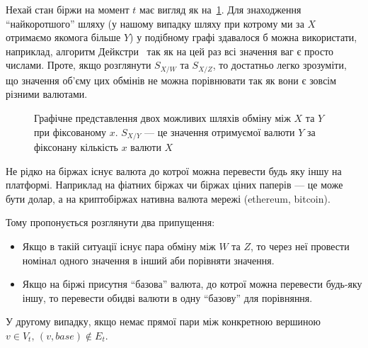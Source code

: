 \documentclass[../index.tex]{subfiles}
\begin{document}
Нехай стан біржи на момент $t$ має вигляд як на~\ref{fig:eval-func-graph}. Для
знаходження ``найкоротшого'' шляху (у нашому випадку шляху при котрому ми за $X$
отримаємо якомога більше $Y$) у подібному графі здавалося б можна використати,
наприклад, алгоритм Дейкстри~\cite{dijkstra} так як на цей раз всі значення ваг
є просто числами. Проте, якщо розглянути $S_{X/W}$ та $S_{X/Z}$, то достатньо
легко зрозуміти, що значення об'єму цих обмінів не можна порівнювати так як вони
є зовсім різними валютами.

\begin{figure}[h]
	\centering
	\caption{Графічне представлення двох можливих шляхів обміну між $X$ та $Y$
		при фіксованому $x$. $S_{X/Y}$ --- це значення отримуємої валюти $Y$ за
		фіксонану кількість $x$ валюти $X$}\label{fig:eval-func-graph}
\end{figure}

Не рідко на біржах існує валюта до котрої можна перевести будь яку іншу на
платформі. Наприклад на фіатних біржах чи біржах ціних паперів --- це може бути
долар, а на криптобіржах нативна валюта мережі (ethereum, bitcoin).

\begin{lemma}
  Тому пропонується розглянути два припущення:

  \begin{itemize}
    \item Якщо в такій ситуації існує пара обміну між $W$ та $Z$, то через неї
          провести номінал одного значення в інший аби порівняти значення.
	\item Якщо на біржі присутня ``базова'' валюта, до котрої можна перевести
          будь-яку іншу, то перевести обидві валюти в одну ``базову'' для
          порівняння.
  \end{itemize}
\end{lemma}

У другому випадку, якщо немає прямої пари між конкретною вершиною
$v \in V_{t},\, (v, base) \notin E_{t}$.
\end{document}
